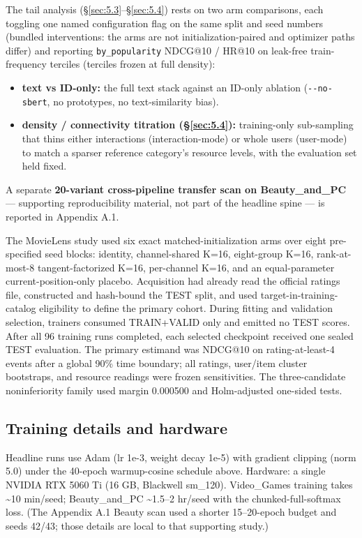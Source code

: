 The tail analysis (\S\ref{sec:5.3}--\S\ref{sec:5.4}) rests on two arm comparisons, each toggling one named configuration flag on the same split and seed numbers (bundled interventions: the arms are not initialization-paired and optimizer paths differ) and reporting \texttt{by\_popularity} NDCG@10 / HR@10 on leak-free train-frequency terciles (terciles frozen at full density):

\begin{itemize}
\tightlist
\item
  \textbf{text vs ID-only:} the full text stack against an ID-only ablation (\texttt{-\/-no-sbert}, no prototypes, no text-similarity bias).
\item
  \textbf{density / connectivity titration (\S\ref{sec:5.4}):} training-only sub-sampling that thins either interactions (interaction-mode) or whole users (user-mode) to match a sparser reference category's resource levels, with the evaluation set held fixed.
\end{itemize}

A separate \textbf{20-variant cross-pipeline transfer scan on Beauty\_and\_\allowbreak PC} --- supporting reproducibility material, not part of the headline spine --- is reported in Appendix A.1.

The MovieLens study used six exact matched-initialization arms over eight pre-specified
seed blocks: identity, channel-shared K=16, eight-group K=16, rank-at-most-8
tangent-factorized K=16, per-channel K=16, and an equal-parameter current-position-only
placebo. Acquisition had already read the official ratings file, constructed and
hash-bound the TEST split, and used target-in-training-catalog eligibility to define
the primary cohort. During fitting and validation selection, trainers consumed
TRAIN+VALID only and emitted no TEST scores. After all 96 training runs completed,
each selected checkpoint received one sealed TEST evaluation. The primary estimand was NDCG@10 on rating-at-least-4 events
after a global 90\% time boundary; all ratings, user/item cluster bootstraps, and
resource readings were frozen sensitivities. The three-candidate noninferiority family
used margin 0.000500 and Holm-adjusted one-sided tests.


\subsection{Training details and hardware}\label{sec:4.4}

Headline runs use Adam (lr 1e-3, weight decay 1e-5) with gradient clipping (norm 5.0) under the 40-epoch warmup-cosine schedule above. Hardware: a single NVIDIA RTX 5060 Ti (16 GB, Blackwell sm\_120). Video\_Games training takes \textasciitilde10 min/seed; Beauty\_and\_\allowbreak PC \textasciitilde1.5--2 hr/seed with the chunked-full-softmax loss. (The Appendix A.1 Beauty scan used a shorter 15--20-epoch budget and seeds 42/43; those details are local to that supporting study.)
